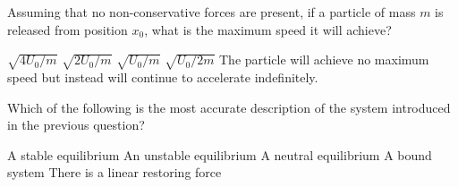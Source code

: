 \documentclass{../../oss-apphys-exam}
\begin{document}
\begin{multicols*}{2}
\begin{multicols*}{2}
\begin{questions}
    \question Assuming that no non-conservative forces are present, if a
    particle of mass $m$ is released from position $x_0$, what is the maximum
    speed it will achieve?
    \label{q:well1}
    \begin{choices}
      \choice $\sqrt{4U_0/m}$
      \choice $\sqrt{2U_0/m}$
      \choice $\sqrt{U_0/m}$
      \choice $\sqrt{U_0/2m}$
      \choice The particle will achieve no maximum speed but instead will
      continue to accelerate indefinitely.
    \end{choices}
    \vspace{.7in}
    
    \question Which of the following is the most accurate description of the
    system introduced in the previous question?
    \label{q:well2}
    \begin{choices}
      \choice A stable equilibrium
      \choice An unstable equilibrium
      \choice A neutral equilibrium
      \choice A bound system
      \choice There is a linear restoring force
    \end{choices}
    \vspace{.7in}
    


\end{questions}
\end{multicols*}
\end{multicols*}
\end{document}
